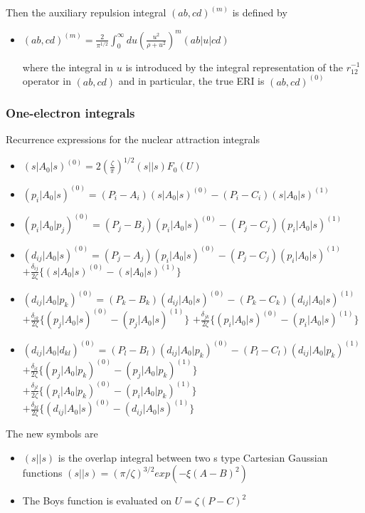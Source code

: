 \documentclass[11pt]{article}
\begin{document}
Then the auxiliary repulsion integral \((ab,cd)^{(m)}\) is defined by

\begin{itemize}
\item \((ab,cd)^{(m)} = \frac{2}{\pi^{1/2}} \int_0^{\infty} du (\frac{u^2}{\rho + u^2})^m (ab|u|cd)\)

where the integral in \(u\) is introduced by the integral representation of the \(r_{12}^{-1}\) operator in \((ab,cd)\) and in particular, the true ERI is \((ab,cd)^{(0)}\)
\end{itemize}
\subsubsection{One-electron integrals}
\label{sec:org11480df}

Recurrence expressions for the nuclear attraction integrals

\begin{itemize}
\item \((s|A_0|s)^{(0)} = 2(\frac{\zeta}{\pi})^{1/2} (s||s) F_0(U)\)
\item \((p_i|A_0|s)^{(0)} = (P_i - A_i)(s|A_0|s)^{(0)} - (P_i-C_i)(s|A_0|s)^{(1)}\)
\item \((p_i|A_0|p_j)^{(0)} = (P_j - B_j)(p_i|A_0|s)^{(0)} - (P_j-C_j)(p_i|A_0|s)^{(1)}\)
\item \((d_{ij}|A_0|s)^{(0)} = (P_j-A_j)(p_i|A_0|s)^{(0)} - (P_j-C_j)(p_i|A_0|s)^{(1)}\)
\(+ \frac{\delta_{ij}}{2\zeta} \{(s|A_0|s)^{(0)}-(s|A_0|s)^{(1)}\}\)
\item \((d_{ij}|A_0|p_k)^{(0)} = (P_k-B_k)(d_{ij}|A_0|s)^{(0)} - (P_k-C_k)(d_{ij}|A_0|s)^{(1)}\)
\(+\frac{\delta_{ik}}{2\zeta} \{(p_j|A_0|s)^{(0)} - (p_j|A_0|s)^{(1)}\}\)
\(+\frac{\delta_{jk}}{2\zeta}\{(p_i|A_0|s)^{(0)}-(p_i|A_0|s)^{(1)}\}\)
\item \((d_{ij}|A_0|d_{kl})^{(0)} = (P_l-B_l)(d_{ij}|A_0|p_k)^{(0)} - (P_l-C_l)(d_{ij}|A_0|p_k)^{(1)}\)
\(+\frac{\delta_{il}}{2\zeta}\{(p_j|A_0|p_k)^{(0)} - (p_j|A_0|p_k)^{(1)}\}\)
\(+\frac{\delta_{jl}}{2\zeta}\{(p_i|A_0|p_k)^{(0)} - (p_i|A_0|p_k)^{(1)}\}\)
\(+\frac{\delta_{kl}}{2\zeta}\{(d_{ij}|A_0|s)^{(0)} - (d_{ij}|A_0|s)^{(1)}\}\)
\end{itemize}

The new symbols are

\begin{itemize}
\item \((s||s)\) is the overlap integral between two s type Cartesian Gaussian functions \((s||s) = (\pi/\zeta)^{3/2} exp(-\xi(A-B)^2)\)

\item The Boys function is evaluated on \(U = \zeta(P-C)^2\)
\end{itemize}
\end{document}
